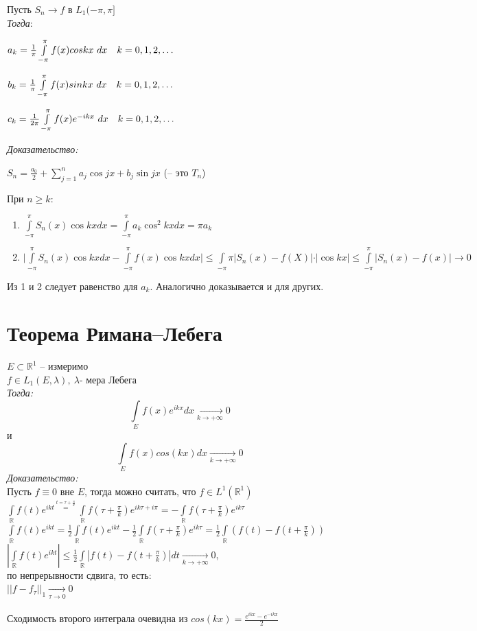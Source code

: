 \documentclass[paper=a4, fontsize=17pt]{article}
\begin{document}
Пусть $S_n \rightarrow f$ в $L_1(-\pi, \pi]$\\

\emph{Тогда}:

$a_k = \frac{1}{\pi}\int\limits_{-\pi}^{\pi}f(x)coskx\ dx \quad k = 0, 1, 2, \mathellipsis$

$b_k = \frac{1}{\pi}\int\limits_{-\pi}^{\pi}f(x)sinkx\ dx \quad k = 0, 1, 2, \mathellipsis$

$c_k = \frac{1}{2\pi}\int\limits_{-\pi}^{\pi}f(x)e^{-ikx}\ dx \quad k = 0, 1, 2, \mathellipsis$


\emph{Доказательство:}

$S_n=\frac{a_0}2 + \sum\limits_{j=1}^n a_j \cos jx + b_j \sin jx$ (-- это $T_n$)

При $n \ge k:$

\begin{enumerate}
	\item
		$\int\limits_{-\pi}^{\pi} S_n(x) \cos kx dx = \int\limits_{-\pi}^{\pi} a_k \cos^2 kx dx = \pi a_k$

	\item
		$\vert \int\limits_{-\pi}^{\pi} S_n(x) \cos kx dx - \int\limits_{-\pi}^{\pi} f(x) \cos kx dx \vert \le \int\limits_{-\pi}{\pi} \vert S_n(x)-f(X) \vert \cdot \vert \cos kx \vert \le \int\limits_{-\pi}^{\pi} \vert S_n(x) - f(x) \vert \rightarrow 0$
\end{enumerate}

Из 1 и 2 следует равенство для $a_k$. Аналогично доказывается и для других.

\section{Теорема Римана--Лебега}
$E \subset \mathds{R}^1$ -- измеримо\\ $f \in L_1(E, \lambda), ~ \lambda \text{- мера Лебега}$ \\
\emph{Тогда:} $$\int\limits_{E}f(x)e^{ikx}dx \xrightarrow[k \to +\infty]{} 0$$ и $$\int\limits_{E}f(x)cos(kx)dx \xrightarrow[k \to +\infty]{} 0$$
\emph{Доказательство:} \\
Пусть $f \equiv 0$ вне $E$, тогда можно считать, что $f \in L^1(\mathds{R}^1)$ \\
$\int\limits_{\mathds{R}}f(t)e^{ikt \overset{t=\tau + \frac{\pi}{k}}{=}} \int\limits_{\mathds{R}}f(\tau + \frac{\pi}{k})e^{i k \tau + i\pi} = -\int\limits_{\mathds{R}}f(\tau + \frac{\pi}{k})e^{ik\tau}$ \\
$\int\limits_{\mathds{R}}f(t)e^{ikt} = \frac{1}{2}\int\limits_{\mathds{R}}f(t)e^{ikt} - \frac{1}{2}\int\limits_{\mathds{R}}f(\tau + \frac{\pi}{k})e^{ik\tau} = \frac{1}{2}\int\limits_{\mathds{R}}(f(t) - f(t + \frac{\pi}{k}))$ \\
$|\int\limits_{\mathds{R}}f(t)e^{ikt}| \leq\frac{1}{2}\int\limits_{\mathds{R}}|f(t) - f(t + \frac{\pi}{k})|dt \xrightarrow[k \to +\infty]{}0$,\\по непрерывности сдвига, то есть:\\$||f-f_{\tau}||_1 \xrightarrow[\tau\to 0]{}0$
\\\\
Сходимость второго интеграла очевидна из $cos(kx) = \frac{e^{ikx} - e^{-ikx}}{2}$
\end{document}
